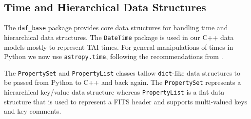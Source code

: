 \subsection{Time and Hierarchical Data Structures}

The \texttt{daf\_base} package provides core data structures for handling time and hierarchical data structures.
The \texttt{DateTime} package is used in our C++ data models mostly to represent TAI times.
For general manipulations of times in Python we now use \texttt{astropy.time}, following the recommendations from \citet{2016SPIE.9913E..0GJ}.

The \texttt{PropertySet} and \texttt{PropertyList} classes tallow \texttt{dict}-like data structures to be passed from Python to C++ and back again.
The \texttt{PropertySet} represents a hierarchical key/value data structure whereas \texttt{PropertyList} is a flat data structure that is used to represent a FITS header and supports multi-valued keys and key comments.
